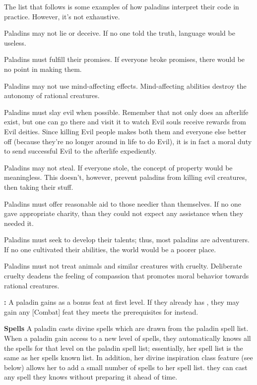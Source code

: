 The list that follows is some examples of how paladins interpret their code in practice. However, it's not exhaustive.
\begin{itemize*}
\item Paladins may not lie or deceive. If no one told the truth, language would be useless.
\item Paladins must fulfill their promises. If everyone broke promises, there would be no point in making them.
\item Paladins may not use mind-affecting effects. Mind-affecting abilities destroy the autonomy of rational creatures.
\item Paladins must slay evil when possible. Remember that not only does an afterlife exist, but one can go there and visit it to watch Evil souls receive rewards from Evil deities. Since killing Evil people makes both them and everyone else better off (because they're no longer around in life to do Evil), it is in fact a moral duty to send successful Evil to the afterlife expediently.
\item Paladins may not steal. If everyone stole, the concept of property would be meaningless. This doesn't, however, prevent paladins from killing evil creatures, then taking their stuff.
\item Paladins must offer reasonable aid to those needier than themselves. If no one gave appropriate charity, than they could not expect any assistance when they needed it.
\item Paladins must seek to develop their talents; thus, most paladins are adventurers. If no one cultivated their abilities, the world would be a poorer place.
\item Paladins must not treat animals and similar creatures with cruelty. Deliberate cruelty deadens the feeling of compassion that promotes moral behavior towards rational creatures.
\end{itemize*}

\textbf{:} A paladin gains  as a bonus feat at first level. If they already has , they may gain any [Combat] feat they meets the prerequisites for instead.

\textbf{Spells} A paladin casts divine spells which are drawn from the paladin spell list. When a paladin gain access to a new level of spells, they automatically knows all the spells for that level on the paladin spell list; essentially, her spell list is the same as her spells known list. In addition, her divine inspiration class feature (see below) allows her to add a small number of spells to her spell list. they can cast any spell they knows without preparing it ahead of time.

